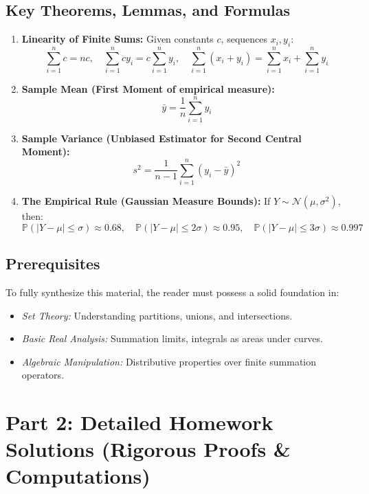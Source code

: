 \documentclass[11pt]{article}
\theoremstyle{definition}
\theoremstyle{remark}
\newcommand{\Prob}{\mathbb{P}}
\newcommand{\samplemean}{\bar{y}}
\begin{document}
\subsection{Key Theorems, Lemmas, and Formulas}
\begin{enumerate}
    \item \textbf{Linearity of Finite Sums:} Given constants $c$, sequences $x_i, y_i$:
    \[ \sum_{i=1}^n c = nc, \quad \sum_{i=1}^n c y_i = c \sum_{i=1}^n y_i, \quad \sum_{i=1}^n (x_i + y_i) = \sum_{i=1}^n x_i + \sum_{i=1}^n y_i \]
    \item \textbf{Sample Mean (First Moment of empirical measure):} 
    \[ \samplemean = \frac{1}{n} \sum_{i=1}^n y_i \]
    \item \textbf{Sample Variance (Unbiased Estimator for Second Central Moment):}
    \[ s^2 = \frac{1}{n-1} \sum_{i=1}^n (y_i - \samplemean)^2 \]
    \item \textbf{The Empirical Rule (Gaussian Measure Bounds):} If $Y \sim \mathcal{N}(\mu, \sigma^2)$, then:
    \[ \Prob(|Y - \mu| \le \sigma) \approx 0.68, \quad \Prob(|Y - \mu| \le 2\sigma) \approx 0.95, \quad \Prob(|Y - \mu| \le 3\sigma) \approx 0.997 \]
\end{enumerate}

\subsection{Prerequisites}
To fully synthesize this material, the reader must possess a solid foundation in:
\begin{itemize}
    \item \textit{Set Theory:} Understanding partitions, unions, and intersections.
    \item \textit{Basic Real Analysis:} Summation limits, integrals as areas under curves.
    \item \textit{Algebraic Manipulation:} Distributive properties over finite summation operators.
\end{itemize}

\section{Part 2: Detailed Homework Solutions (Rigorous Proofs \& Computations)}
\end{document}
